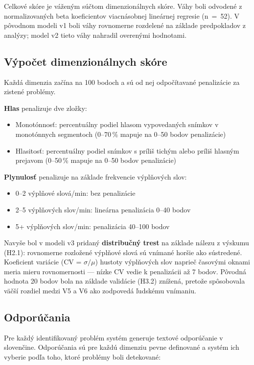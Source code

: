 Celkové skóre je váženým súčtom dimenzionálnych skóre.
Váhy boli odvodené z normalizovaných beta koeficientov viacnásobnej lineárnej regresie (n~=~52).
V pôvodnom modeli v1 boli váhy rovnomerne rozdelené na základe predpokladov z analýzy; model v2 tieto váhy nahradil overenými hodnotami.

\subsection{Výpočet dimenzionálnych skóre}

Každá dimenzia začína na 100 bodoch a sú od nej odpočítavané penalizácie za zistené problémy.

\textbf{Hlas} penalizuje dve zložky:
\begin{itemize}
    \item Monotónnosť: percentuálny podiel hlasom vypovedaných snímkov v monotónnych segmentoch (0--70\,\% mapuje na 0--50 bodov penalizácie)
    \item Hlasitosť: percentuálny podiel snímkov s príliš tichým alebo príliš hlasným prejavom (0--50\,\% mapuje na 0--50 bodov penalizácie)
\end{itemize}

\textbf{Plynulosť} penalizuje na základe frekvencie výplňových slov:
\begin{itemize}
    \item 0--2 výplňové slová/min: bez penalizácie
    \item 2--5 výplňových slov/min: lineárna penalizácia 0--40 bodov
    \item 5+ výplňových slov/min: penalizácia 40--100 bodov
\end{itemize}

Navyše bol v modeli v3 pridaný \textbf{distribučný trest} na základe nálezu z výskumu (H2.1): rovnomerne rozložené výplňové slová sú vnímané horšie ako sústredené.
Koeficient variácie (CV = $\sigma/\mu$) hustoty výplňových slov naprieč časovými oknami meria mieru rovnomernosti --- nízke CV vedie k penalizácii až 7 bodov. Pôvodná hodnota 20 bodov bola na základe validácie (H3.2) znížená, pretože spôsobovala väčší rozdiel medzi V5 a V6 ako zodpovedá ľudskému vnímaniu.

\subsection{Odporúčania}

Pre každý identifikovaný problém systém generuje textové odporúčanie v slovenčine. Odporúčania sú pre každú dimenziu pevne definované a systém ich vyberie podľa toho, ktoré problémy boli detekované:

